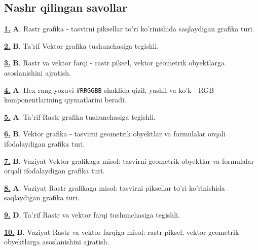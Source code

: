 \documentclass[10pt,a4paper,oneside]{article}
\begin{document}
\subsection{Nashr qilingan savollar}
\noindent\hyperlink{q1}{\textbf{1.}} \textbf{A}.  Rastr grafika - tasvirni piksellar to'ri ko'rinishida saqlaydigan grafika turi.
\par\vspace{3mm}
\noindent\hyperlink{q2}{\textbf{2.}} \textbf{B}.  Ta'rif Vektor grafika tushunchasiga tegishli.
\par\vspace{3mm}
\noindent\hyperlink{q3}{\textbf{3.}} \textbf{B}.  Rastr va vektor farqi - rastr piksel, vektor geometrik obyektlarga asoslanishini ajratish.
\par\vspace{3mm}
\noindent\hyperlink{q4}{\textbf{4.}} \textbf{A}.  Hex rang yozuvi \texttt{\#RRGGBB} shaklida qizil, yashil va ko'k - RGB komponentlarining qiymatlarini beradi.
\par\vspace{3mm}
\noindent\hyperlink{q5}{\textbf{5.}} \textbf{A}.  Ta'rif Rastr grafika tushunchasiga tegishli.
\par\vspace{3mm}
\noindent\hyperlink{q6}{\textbf{6.}} \textbf{B}.  Vektor grafika - tasvirni geometrik obyektlar va formulalar orqali ifodalaydigan grafika turi.
\par\vspace{3mm}
\noindent\hyperlink{q7}{\textbf{7.}} \textbf{B}.  Vaziyat Vektor grafikaga misol: tasvirni geometrik obyektlar va formulalar orqali ifodalaydigan grafika turi.
\par\vspace{3mm}
\noindent\hyperlink{q8}{\textbf{8.}} \textbf{A}.  Vaziyat Rastr grafikaga misol: tasvirni piksellar to'ri ko'rinishida saqlaydigan grafika turi.
\par\vspace{3mm}
\noindent\hyperlink{q9}{\textbf{9.}} \textbf{D}.  Ta'rif Rastr va vektor farqi tushunchasiga tegishli.
\par\vspace{3mm}
\noindent\hyperlink{q10}{\textbf{10.}} \textbf{B}.  Vaziyat Rastr va vektor farqiga misol: rastr piksel, vektor geometrik obyektlarga asoslanishini ajratish.
\end{document}
